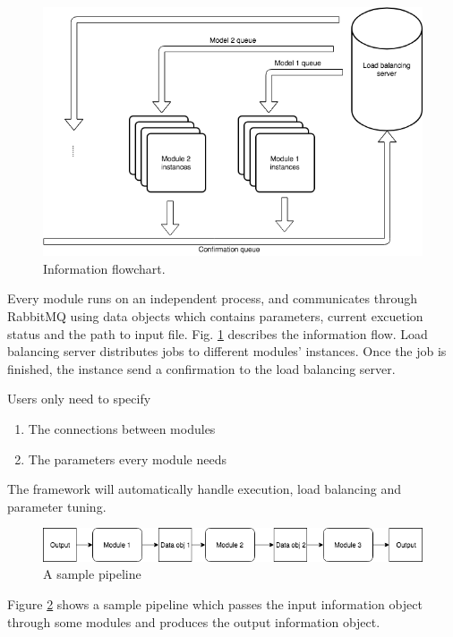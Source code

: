 \documentclass{article}
\begin{document}
    \begin{figure}[h]
        \begin{center}
            \includegraphics[width=\textwidth]{fig/information_flow.png}
        \end{center}
        \label{fig:information_flow}
        \caption{Information flowchart.}
    \end{figure}


    Every module runs on an independent process,
    and communicates through RabbitMQ using data objects which contains parameters, current excuetion status and the path to input file.
    Fig. \ref{fig:information_flow} describes the information flow.
    Load balancing server distributes jobs to different modules' instances.
    Once the job is finished, the instance send a confirmation to the load balancing server.


    Users only need to specify
    \begin{enumerate}
        \item The connections between modules
        \item The parameters every module needs
    \end{enumerate}
    The framework will automatically handle execution, load balancing and parameter tuning.

    \begin{figure}[H]
        \begin{center}
            \includegraphics[width=1.2\textwidth]{fig/sample_pipeline.png}
        \end{center}
        \label{fig:sample_pipeline}
        \caption{A sample pipeline}
    \end{figure}
    Figure \ref{fig:sample_pipeline} shows a sample pipeline which passes the input information object
    through some modules and produces the output information object.
\end{document}
